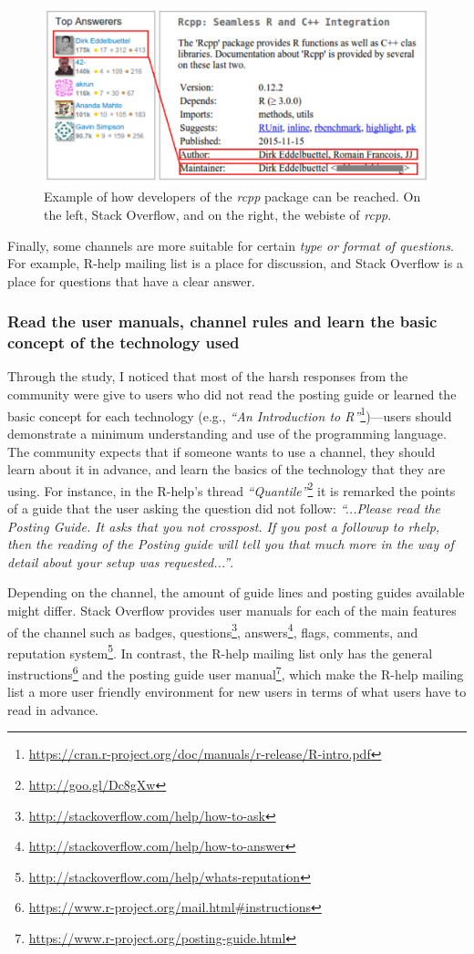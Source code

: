 \documentclass{sig-alternate-05-2015}
\begin{document}
		\begin{figure} [!htb]
			\centering
			\includegraphics[width=0.7\columnwidth]{Figures/CCchannel}
			\caption{Example of how developers of the \emph{rcpp} package can be reached. On the left, Stack Overflow, and on the right, the webiste of \emph{rcpp}.}
			\label{fig:CCchannel}
		\end{figure}

		Finally, some channels are more suitable for certain \emph{type or format of questions}. 
		For example, R-help mailing list is a place for discussion, and Stack Overflow is a place for questions that have a clear answer.


	\subsubsection{Read the user manuals, channel rules and learn the basic concept of the technology used}

		Through the study, I noticed that most of the harsh responses from the community were give to users who did not read the posting guide or learned the basic concept for each technology (e.g., \textit{``An Introduction to R''}\footnote{\url{https://cran.r-project.org/doc/manuals/r-release/R-intro.pdf}})---users should demonstrate a minimum understanding and use of the programming language.
		The community expects that if someone wants to use a channel, they should learn about it in advance, and learn the basics of the technology that they are using.
		For instance, in the R-help's thread \textit{``Quantile''}\footnote{\url{http://goo.gl/Dc8gXw}} it is remarked the points of a guide that the user asking the question did not follow: \textit{``...Please read the Posting Guide. It asks that you not crosspost. If you post a followup to rhelp, then the reading of the Posting guide will tell you that much more in the way of detail about your setup was requested...''}.

		Depending on the channel, the amount of guide lines and posting guides available might differ. 
		Stack Overflow provides user manuals for each of the main features of the channel such as badges, questions\footnote{\url{http://stackoverflow.com/help/how-to-ask}}, answers\footnote{\url{http://stackoverflow.com/help/how-to-answer}}, flags, comments, and reputation system\footnote{\url{http://stackoverflow.com/help/whats-reputation}}.
		In contrast, the R-help mailing list only has the general instructions\footnote{\url{https://www.r-project.org/mail.html\#instructions}} and the posting guide user manual\footnote{\url{https://www.r-project.org/posting-guide.html}}, which make the R-help mailing list a more user friendly environment for new users in terms of what users have to read in advance.
\end{document}
